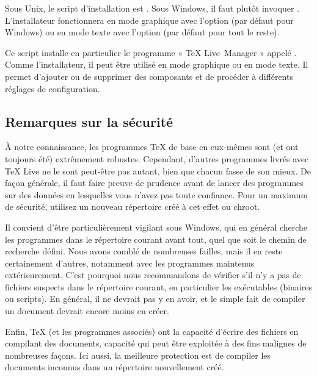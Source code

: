 \documentclass[german, english, french]{article}
\renewcommand{\TL}{\TeX{} Live\xspace}%
\begin{document}
\begin{itemize*}

\item Sous Unix, le script d'installation est .  Sous
  Windows, il faut plutôt invoquer .
  L'installateur fonctionnera en mode graphique avec l'option 
  (par défaut pour Windows) ou en mode texte avec l'option
   (par défaut pour tout le reste).

\item Ce script installe en particulier le programme « \TL\ Manager » appelé
  . Comme l'installateur, il peut être utilisé en mode graphique ou
  en mode texte. Il permet d'ajouter ou de supprimer des composants et de
  procéder à différents réglages de configuration.

\end{itemize*}

\subsection{Remarques sur la sécurité}
\label{sec:security}

À notre connaissance, les programmes \TeX{} de base en eux-mêmes sont (et ont
toujours été) extrêmement robustes. Cependant, d'autres programmes livrés avec
\TL{} ne le sont peut-être pas autant, bien que chacun fasse de son mieux. De
façon générale, il faut faire preuve de prudence avant de lancer des programmes
sur des données en lesquelles vous n'avez pas toute confiance. Pour un maximum
de sécurité, utilisez un nouveau répertoire créé à cet effet ou chroot.

Il convient d'être particulièrement vigilant sous Windows, qui en général
cherche les programmes dans le répertoire courant avant tout, quel que soit le
chemin de recherche défini. Nous avons comblé de nombreuses failles, mais il en
reste certainement d'autres, notamment avec les programmes maintenus
extérieurement. C'est pourquoi nous recommandons de vérifier s'il n'y a pas de
fichiers suspects dans le répertoire courant, en particulier les exécutables
(binaires ou scripts). En général, il ne devrait pas y en avoir, et le simple
fait de compiler un document devrait encore moins en créer.

Enfin, \TeX{} (et les programmes associés) ont la capacité d'écrire des fichiers
en compilant des documents, capacité qui peut être exploitée à des fins malignes
de nombreuses façons. Ici aussi, la meilleure protection est de compiler les
documents inconnus dans un répertoire nouvellement créé.
\end{document}
